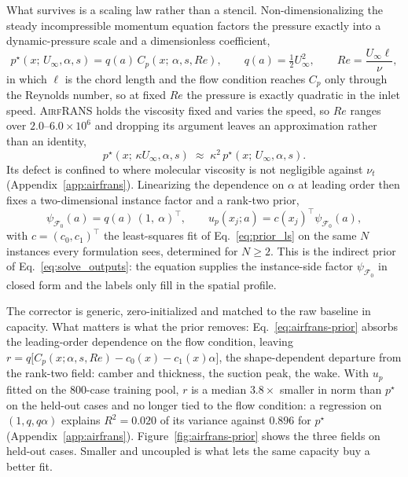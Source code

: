 \documentclass{article}
\begin{document}
What survives is a scaling law rather than a stencil. Non-dimensionalizing the steady
incompressible momentum equation factors the pressure exactly into a dynamic-pressure
scale and a dimensionless coefficient,
\begin{equation}
  p^\star(x;\, U_\infty, \alpha, s) = q(a)\, C_p(x;\, \alpha, s, Re),
  \qquad
  q(a) = \tfrac12 U_\infty^{2},
  \qquad
  Re = \frac{U_\infty \ell}{\nu},
  \label{eq:cp}
\end{equation}
in which \(\ell\) is the chord length and the flow condition reaches $C_p$ only through the Reynolds number, so at
fixed $Re$ the pressure is exactly quadratic in the inlet speed. \textsc{AirfRANS}
holds the viscosity fixed and varies the speed, so $Re$ ranges over
$2.0$--$6.0\times10^{6}$ and dropping its argument leaves an approximation rather than
an identity,
\begin{equation}
  p^\star(x;\, \kappa U_\infty, \alpha, s) \;\approx\; \kappa^{2}\, p^\star(x;\, U_\infty, \alpha, s).
  \label{eq:invariance}
\end{equation}
Its defect is confined to where molecular viscosity is not negligible against
$\nu_t$ (Appendix~\ref{app:airfrans}). Linearizing the dependence on $\alpha$ at
leading order then fixes a two-dimensional instance factor and a rank-two prior,
\begin{equation}
  \psi_{\mathcal{F}_0}(a) = q(a)\,(1,\ \alpha)^{\!\top},
  \qquad
  u_p(x_j; a) = c(x_j)^{\!\top}\psi_{\mathcal{F}_0}(a),
  \label{eq:airfrans-prior}
\end{equation}
with \(c=(c_0,c_1)^{\!\top}\) the least-squares fit of Eq.~\ref{eq:prior_ls} on the same $N$ instances
every formulation sees, determined for $N\ge2$. This is the indirect prior of
Eq.~\ref{eq:solve_outputs}: the equation supplies the instance-side factor
$\psi_{\mathcal{F}_0}$ in closed form and the labels only fill in the spatial
profile.

The corrector is generic, zero-initialized and matched to the raw baseline in capacity.
What matters is what the prior removes: Eq.~\ref{eq:airfrans-prior} absorbs the
leading-order dependence on the flow condition, leaving
$r=q\bigl[C_p(x;\alpha,s,Re)-c_0(x)-c_1(x)\alpha\bigr]$, the shape-dependent departure
from the rank-two field: camber and thickness, the suction peak, the wake. With
$u_p$ fitted on the $800$-case training pool, $r$ is a median $3.8\times$ smaller in
norm than $p^\star$ on the held-out cases and no longer tied to the flow condition: a
regression on $(1,q,q\alpha)$ explains $R^{2}=0.020$ of its variance against $0.896$
for $p^\star$ (Appendix~\ref{app:airfrans}). Figure~\ref{fig:airfrans-prior} shows the three fields on held-out cases.
Smaller and uncoupled is what lets the same capacity buy a better fit.
\end{document}

